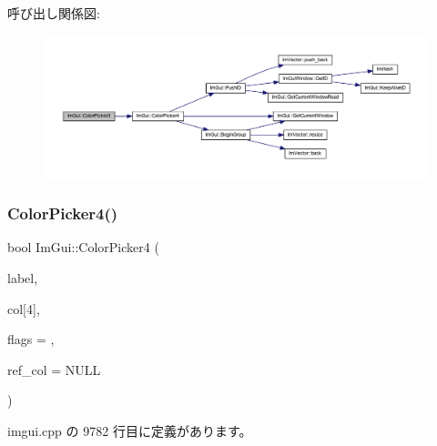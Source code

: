 呼び出し関係図\+:\nopagebreak
\begin{figure}[H]
\begin{center}
\leavevmode
\includegraphics[width=350pt]{namespace_im_gui_a2a2a98cb9a17b18702be6b954670b388_cgraph}
\end{center}
\end{figure}
\mbox{\label{namespace_im_gui_a3d5aae9e0a14aa051d5a799abbe97b32}} 
\subsubsection{\texorpdfstring{Color\+Picker4()}{ColorPicker4()}}
{\footnotesize\ttfamily bool Im\+Gui\+::\+Color\+Picker4 (\begin{DoxyParamCaption}\item[{const char $\ast$}]{label,  }\item[{float}]{col\mbox{[}4\mbox{]},  }\item[{\mbox{\hyperlink{imgui_8h_a6b2d5e95adc38f22c021252189f669c6}{Im\+Gui\+Color\+Edit\+Flags}}}]{flags = {},  }\item[{const float $\ast$}]{ref\+\_\+col = {\ttfamily NULL} }\end{DoxyParamCaption})}



 imgui.\+cpp の 9782 行目に定義があります。

